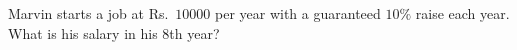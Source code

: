 Marvin starts a job at Rs.~$10000$ per year with a guaranteed $10\%$ raise each year. What is his salary in his $8$th year?

